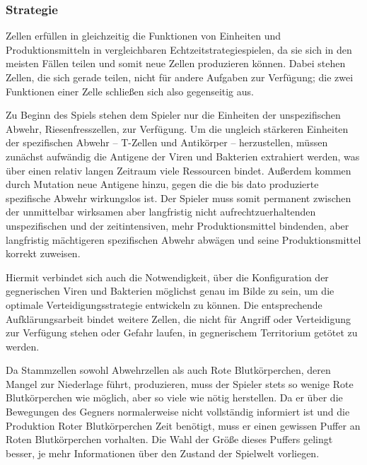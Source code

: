 \subsubsection{Strategie}


Zellen erfüllen in \name{} gleichzeitig die Funktionen von Einheiten und
Produktionsmitteln in vergleichbaren Echtzeitstrategiespielen, da sie sich
in den meisten Fällen teilen und somit neue Zellen produzieren können. Dabei
stehen Zellen, die sich gerade teilen, nicht für andere Aufgaben zur Verfügung;
die zwei Funktionen einer Zelle schließen sich also gegenseitig aus.


Zu Beginn des Spiels stehen dem Spieler nur die Einheiten der unspezifischen
Abwehr, Riesenfresszellen, zur Verfügung. Um die ungleich stärkeren Einheiten
der spezifischen Abwehr -- T-Zellen und Antikörper -- herzustellen, müssen
zunächst aufwändig die Antigene der Viren und Bakterien extrahiert werden, was
über einen relativ langen Zeitraum viele Ressourcen bindet. Außerdem kommen
durch Mutation neue Antigene hinzu, gegen die die bis dato produzierte
spezifische Abwehr wirkungslos ist. Der Spieler muss somit permanent
zwischen der unmittelbar wirksamen aber langfristig nicht aufrechtzuerhaltenden
unspezifischen und der zeitintensiven, mehr Produktionsmittel bindenden, aber
langfristig mächtigeren spezifischen Abwehr abwägen und seine Produktionsmittel
korrekt zuweisen.

Hiermit verbindet sich auch die Notwendigkeit, über die Konfiguration der
gegnerischen Viren und Bakterien möglichst genau im Bilde zu sein, um die
optimale Verteidigungsstrategie entwickeln zu können. Die entsprechende
Aufklärungsarbeit bindet weitere Zellen, die nicht für Angriff oder
Verteidigung zur Verfügung stehen oder Gefahr laufen, in gegnerischem
Territorium getötet zu werden.


Da Stammzellen sowohl Abwehrzellen als auch Rote Blutkörperchen, deren Mangel
zur Niederlage führt, produzieren, muss der Spieler stets so wenige
Rote Blutkörperchen wie möglich, aber so viele wie nötig herstellen. Da
er über die Bewegungen des Gegners normalerweise nicht vollständig informiert
ist und die Produktion Roter Blutkörperchen Zeit benötigt, muss er einen
gewissen Puffer an Roten Blutkörperchen vorhalten. Die Wahl der Größe dieses
Puffers gelingt besser, je mehr Informationen über den Zustand der Spielwelt
vorliegen.

